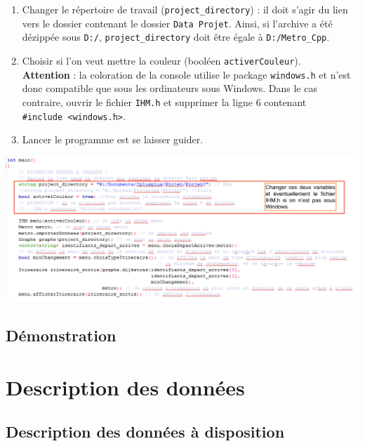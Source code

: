 \documentclass[,french]{article}
\begin{document}
\begin{enumerate}
\def\labelenumi{\arabic{enumi}.}
\item
  Changer le répertoire de travail (\texttt{project\_directory}) : il
  doit s'agir du lien vers le dossier contenant le dossier
  \texttt{Data\ Projet}. Ainsi, si l'archive a été dézippée sous
  \texttt{D:/}, \texttt{project\_directory} doit être égale à
  \texttt{D:/Metro\_Cpp}.
\item
  Choisir si l'on veut mettre la couleur (booléen
  \texttt{activerCouleur}).\\
  \bcattention  \textbf{Attention} : la coloration de la console utilise
  le package \texttt{windows.h} et n'est donc compatible que sous les
  ordinateurs sous Windows. Dans le cas contraire, ouvrir le fichier
  \texttt{IHM.h} et supprimer la ligne 6 contenant
  \texttt{\#include\ \textless{}windows.h\textgreater{}}.
\item
  Lancer le programme est se laisser guider.
\end{enumerate}

\includegraphics{img/main.png}

\hypertarget{duxe9monstration}{%
\subsection{Démonstration}\label{duxe9monstration}}

\hypertarget{sec:def_donnees}{%
\section{Description des données}\label{sec:def_donnees}}

\hypertarget{description-des-donnuxe9es-uxe0-disposition}{%
\subsection{Description des données à
disposition}\label{description-des-donnuxe9es-uxe0-disposition}}
\end{document}
